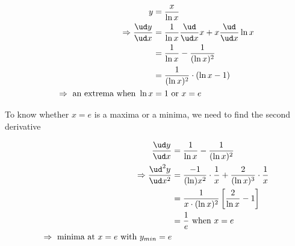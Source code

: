 \begin{solution}
	\begin{align}
	   y &= \dfrac{x}{\ln x} \\
	   \Rightarrow \dfrac{\ud y}{\ud x} &= \dfrac{1}{\ln x}\dfrac{\ud}{\ud x}x 
	             + x\dfrac{\ud}{\ud x}\ln x \\
	     &= \dfrac{1}{\ln x} - \dfrac{1}{(\ln x)^2} \\
	     &= \dfrac{1}{(\ln x)^2}\cdot(\ln x - 1) \\
	     \Rightarrow \text{ an extrema when } \ln x &= 1 \text{ or } x = e
	\end{align}
	
	To know whether $x=e$ is a maxima or a minima, we need to find the second derivative
	
	\begin{align}
	   \dfrac{\ud y}{\ud x} &= \dfrac{1}{\ln x} - \dfrac{1}{(\ln x)^2} \\
	   \Rightarrow \dfrac{\ud^2 y}{\ud x^2} &= \dfrac{-1}{(\ln)x^2}\cdot\dfrac{1}{x}
	                                        + \dfrac{2}{(\ln x)^3}\cdot\dfrac{1}{x} \\
	               &= \dfrac{1}{x\cdot(\ln x)^2}\left[ \dfrac{2}{\ln x} - 1\right] \\
	               &= \dfrac{1}{e} \text{ when } x = e \\
	               \Rightarrow \text{ minima at } x = e \text{ with } y_{min} = e
	\end{align}
\end{solution}
